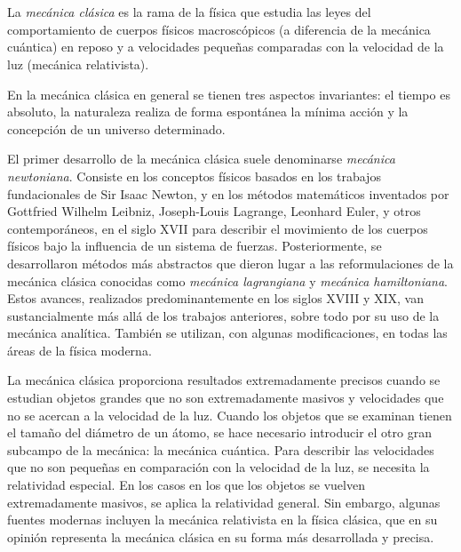 \chapter*{}


La \emph{mecánica clásica} es la rama de la física que estudia las leyes del comportamiento de cuerpos físicos macroscópicos (a diferencia de la mecánica cuántica) en reposo y a velocidades pequeñas comparadas con la velocidad de la luz (mecánica relativista).

En la mecánica clásica en general se tienen tres aspectos invariantes: el tiempo es absoluto, la naturaleza realiza de forma espontánea la mínima acción y la concepción de un universo determinado.


El primer desarrollo de la mecánica clásica suele denominarse \emph{mecánica newtoniana}. Consiste en los conceptos físicos basados en los trabajos fundacionales de Sir Isaac Newton, y en los métodos matemáticos inventados por Gottfried Wilhelm Leibniz, Joseph-Louis Lagrange, Leonhard Euler, y otros contemporáneos, en el siglo XVII para describir el movimiento de los cuerpos físicos bajo la influencia de un sistema de fuerzas. Posteriormente, se desarrollaron métodos más abstractos que dieron lugar a las reformulaciones de la mecánica clásica conocidas como \emph{mecánica lagrangiana} y \emph{mecánica hamiltoniana}. Estos avances, realizados predominantemente en los siglos XVIII y XIX, van sustancialmente más allá de los trabajos anteriores, sobre todo por su uso de la mecánica analítica. También se utilizan, con algunas modificaciones, en todas las áreas de la física moderna.

La mecánica clásica proporciona resultados extremadamente precisos cuando se estudian objetos grandes que no son extremadamente masivos y velocidades que no se acercan a la velocidad de la luz. Cuando los objetos que se examinan tienen el tamaño del diámetro de un átomo, se hace necesario introducir el otro gran subcampo de la mecánica: la mecánica cuántica. Para describir las velocidades que no son pequeñas en comparación con la velocidad de la luz, se necesita la relatividad especial. En los casos en los que los objetos se vuelven extremadamente masivos, se aplica la relatividad general. Sin embargo, algunas fuentes modernas incluyen la mecánica relativista en la física clásica, que en su opinión representa la mecánica clásica en su forma más desarrollada y precisa.

